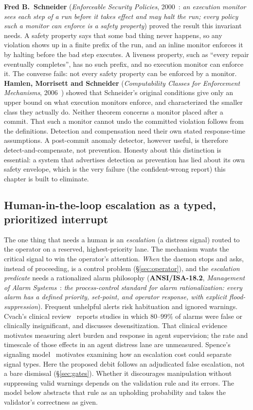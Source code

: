 \documentclass[11pt,a4paper]{article}
\theoremstyle{definition}
\theoremstyle{plain}
\begin{document}
\textbf{Fred B.\ Schneider} (\emph{Enforceable Security Policies},
2000~: \emph{an execution monitor sees each step of a run
before it takes effect and may halt the run; every policy such a monitor can
enforce is a safety property}) proved the result this invariant needs. A safety
property says that some bad thing never happens, so any violation shows up in a
finite prefix of the run, and an inline monitor enforces it by halting before the
bad step executes. A liveness property, such as ``every repair eventually
completes'', has no such prefix, and no execution monitor can enforce it. The
converse fails: not every safety property can be enforced by a monitor.
\textbf{Hamlen, Morrisett and Schneider} (\emph{Computability Classes for
Enforcement Mechanisms}, 2006~) showed that Schneider's
original conditions give only an upper bound on what execution monitors enforce,
and characterized the smaller class they actually do. Neither theorem concerns a
monitor placed after a commit. That such a monitor cannot undo the committed
violation follows from the definitions. Detection and compensation need their
own stated response-time assumptions. A post-commit anomaly detector, however useful, is
therefore detect-and-compensate, not prevention. Honesty about this distinction is
essential: a system that advertises detection as prevention has lied about its own
safety envelope, which is the very failure (the confident-wrong report) this chapter is
built to eliminate.

\subsection{Human-in-the-loop escalation as a typed, prioritized interrupt}\label{sec:escalation}

The one thing that needs a human is an \emph{escalation} (a distress signal) routed
to the operator on a reserved, highest-priority lane. The mechanism wants the
critical signal to win the operator's attention. \emph{When} the daemon
stops and asks, instead of proceeding, is a control problem (\S\ref{sec:operator}), and the
\emph{escalation predicate} needs a rationalized alarm
philosophy (\textbf{ANSI/ISA-18.2}, \emph{Management of Alarm
Systems}~: \emph{the process-control standard for alarm
rationalization: every alarm has a defined priority, set-point, and operator
response, with explicit flood-suppression}). Frequent unhelpful alerts risk
habituation and ignored warnings. Cvach's clinical review~
reports studies in which $80$--$99\%$ of alarms were false or clinically
insignificant, and discusses desensitization. That clinical evidence motivates
measuring alert burden and response in agent supervision; the rate and
timescale of those effects in an agent distress lane are unmeasured. Spence's signaling model~ motivates examining how an
escalation cost could separate signal types. Here the proposed debit follows an
adjudicated false escalation, not a bare dismissal (\S\ref{sec:gates}). Whether
it discourages manipulation without suppressing valid warnings depends on the
validation rule and its errors. The model below abstracts that rule as an
upholding probability and takes the validator's correctness as given.
\end{document}
